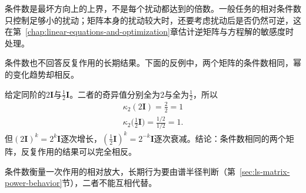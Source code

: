 条件数是最坏方向上的上界，不是每个扰动都达到的倍数。一般任务的相对条件数只控制足够小的扰动；矩阵本身的扰动较大时，还要考虑扰动后是否仍然可逆，这在第~\ref{chap:linear-equations-and-optimization}章估计逆矩阵与方程解的敏感度时处理。

条件数也不回答反复作用的长期结果。下面的反例中，两个矩阵的条件数相同，幂的变化趋势却相反。
\begin{example}[反例：条件数相同而幂的趋势相反]
\label{ex:ls-condition-number-vs-powers}
给定同阶的$2\bm I$与$\tfrac12\bm I$。二者的奇异值分别全为$2$与全为$\tfrac12$，所以
\[
 \begin{gathered}
\kappa_2(2\bm I)=\frac{2}{2}=1\\
\kappa_2\bigl(\tfrac12\bm I\bigr)=\frac{1/2}{1/2}=1 .
 \end{gathered}
\]
但$(2\bm I)^k=2^k\bm I$逐次增长，$(\tfrac12\bm I)^k=2^{-k}\bm I$逐次衰减。结论：条件数相同的两个矩阵，反复作用的结果可以完全相反。
\end{example}
条件数衡量一次作用的相对放大，长期行为要由谱半径判断（第~\ref{sec:ls-matrix-power-behavior}节），二者不能互相代替。
